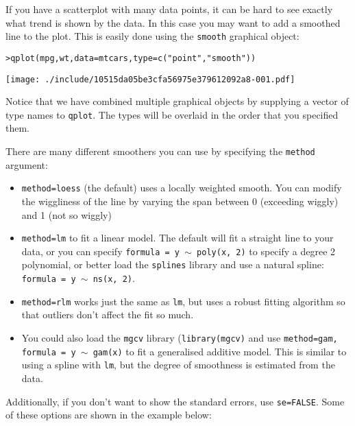 If you have a scatterplot with many data points, it can be hard to see exactly what trend is shown by the data.  In this case you may want to add a smoothed line to the plot.  This is easily done using the {\tt smooth} graphical object:

\begin{alltt}
> qplot(mpg, wt, data = mtcars, type = c("point", "smooth"))
\end{alltt}
\texttt{[image: ./include/10515da05be3cfa56975e379612092a8-001.pdf]}
\begin{alltt}

\end{alltt}

Notice that we have combined multiple graphical objects by supplying a vector of type names to {\tt qplot}.  The types will be overlaid in the order that you specified them.

There are many different smoothers you can use by specifying the {\tt method} argument:

\begin{itemize}
	\item {\tt method=loess} (the default) uses a locally weighted smooth.  You can modify the wiggliness of the line by varying the span between 0 (exceeding wiggly) and 1 (not so wiggly)

	\item {\tt method=lm} to fit a linear model.  The default will fit a straight line to your data, or you can specify {\tt formula = y $\sim$ poly(x, 2)} to specify a degree 2 polynomial, or better load the {\tt splines} library and use a natural spline: {\tt formula = y $\sim$ ns(x, 2)}.

	\item {\tt method=rlm} works just the same as {\tt lm}, but uses a robust fitting algorithm so that outliers don't affect the fit so much.

	\item You could also load the {\tt mgcv} library ({\tt library(mgcv)} and use {\tt method=gam, formula = y $\sim$ gam(x)} to fit a generalised additive model.  This is similar to using a spline with {\tt lm}, but the degree of smoothness is estimated from the data.
\end{itemize}

Additionally, if you don't want to show the standard errors, use {\tt se=FALSE}.  Some of these options are shown in the example below:

